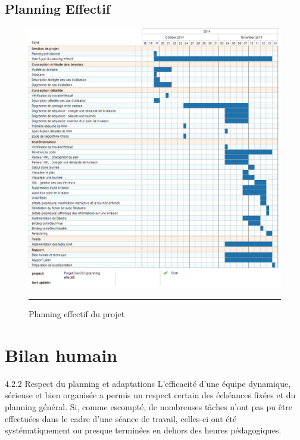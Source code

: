 \subsection{Planning Effectif}
\begin{figure}[htbp]
	\centering
		\includegraphics[width=\textwidth,height=\textheight,keepaspectratio]{Figures/effective_plan}
		\rule{35em}{0.5pt}
	\caption[Planning effectif du projet]{Planning effectif du projet}
\end{figure}
\clearpage


\section{Bilan humain}


4.2.2 Respect du planning et adaptations
L’efficacité d’une équipe dynamique, sérieuse et bien organisée a permis un respect certain
des échéances fixées et du planning général. Si, comme escompté, de nombreuses tâches n’ont
pas pu être effectuées dans le cadre d’une séance de travail, celles-ci ont été systématiquement
ou presque terminées en dehors des heures pédagogiques.


